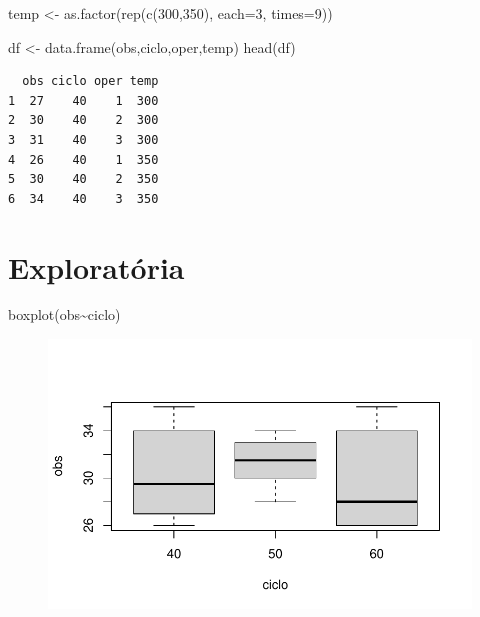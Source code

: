 \documentclass[
  letterpaper,
  DIV=11,
  numbers=noendperiod]{scrartcl}
\newenvironment{Shaded}{\begin{snugshade}}{\end{snugshade}}
\newcommand{\AttributeTok}[1]{\textcolor[rgb]{0.40,0.45,0.13}{#1}}
\newcommand{\DecValTok}[1]{\textcolor[rgb]{0.68,0.00,0.00}{#1}}
\newcommand{\FunctionTok}[1]{\textcolor[rgb]{0.28,0.35,0.67}{#1}}
\newcommand{\NormalTok}[1]{\textcolor[rgb]{0.00,0.23,0.31}{#1}}
\newcommand{\OtherTok}[1]{\textcolor[rgb]{0.00,0.23,0.31}{#1}}
\newcommand{\SpecialCharTok}[1]{\textcolor[rgb]{0.37,0.37,0.37}{#1}}
\begin{document}
\begin{Shaded}
\begin{Highlighting}[]
\NormalTok{temp }\OtherTok{\textless{}{-}} \FunctionTok{as.factor}\NormalTok{(}\FunctionTok{rep}\NormalTok{(}\FunctionTok{c}\NormalTok{(}\DecValTok{300}\NormalTok{,}\DecValTok{350}\NormalTok{), }\AttributeTok{each=}\DecValTok{3}\NormalTok{, }\AttributeTok{times=}\DecValTok{9}\NormalTok{))}

\NormalTok{df }\OtherTok{\textless{}{-}} \FunctionTok{data.frame}\NormalTok{(obs,ciclo,oper,temp)}
\FunctionTok{head}\NormalTok{(df)}
\end{Highlighting}
\end{Shaded}

\begin{verbatim}
  obs ciclo oper temp
1  27    40    1  300
2  30    40    2  300
3  31    40    3  300
4  26    40    1  350
5  30    40    2  350
6  34    40    3  350
\end{verbatim}

\hypertarget{exploratuxf3ria}{%
\section{Exploratória}\label{exploratuxf3ria}}

\begin{Shaded}
\begin{Highlighting}[]
\FunctionTok{boxplot}\NormalTok{(obs}\SpecialCharTok{\textasciitilde{}}\NormalTok{ciclo)}
\end{Highlighting}
\end{Shaded}

\begin{figure}[H]

{\centering \includegraphics{fatorial_multi_files/figure-pdf/unnamed-chunk-3-1.pdf}

}

\end{figure}
\end{document}
